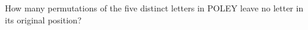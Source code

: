 How many permutations of the five distinct letters in POLEY leave no letter in its original position?
